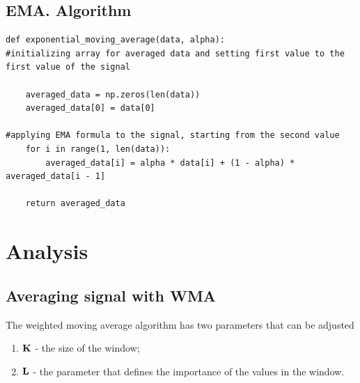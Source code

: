 \documentclass[a4paper,12pt,fleqn]{article}
\begin{document}
        \subsection{EMA. Algorithm}
        \begin{verbatim}
def exponential_moving_average(data, alpha):
#initializing array for averaged data and setting first value to the first value of the signal
 
    averaged_data = np.zeros(len(data))
    averaged_data[0] = data[0]
    
#applying EMA formula to the signal, starting from the second value
    for i in range(1, len(data)):
        averaged_data[i] = alpha * data[i] + (1 - alpha) * averaged_data[i - 1]
        
    return averaged_data
            \end{verbatim}

        \newpage
        \section{Analysis}

        \subsection{Averaging signal with WMA}

        \hspace{1em} The weighted moving average algorithm has two parameters that can be adjusted

        \begin{enumerate}
                \item \begin{math} \bold{K}\end{math} - the size of the window;
                \item \begin{math}
                    \bold{L}
                \end{math} - the parameter that defines the importance of the values in the window.

                \end{enumerate}
\end{document}
